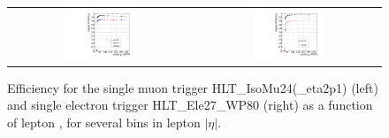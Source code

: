 \begin{figure}[!ht]
\begin{center}
\begin{tabular}{cc}
\includegraphics[width=0.4\textwidth]{plots/mutrig_20fb.pdf} &
\includegraphics[width=0.4\textwidth]{plots/eltrig_20fb.pdf} \\
\end{tabular}
\caption{\label{fig:trigeff}
Efficiency for the single muon trigger HLT\_IsoMu24(\_eta2p1) (left) and single electron trigger HLT\_Ele27\_WP80 (right) as a function of lepton \pt,
for several bins in lepton $|\eta|$.
}
\end{center}
\end{figure}

\clearpage

